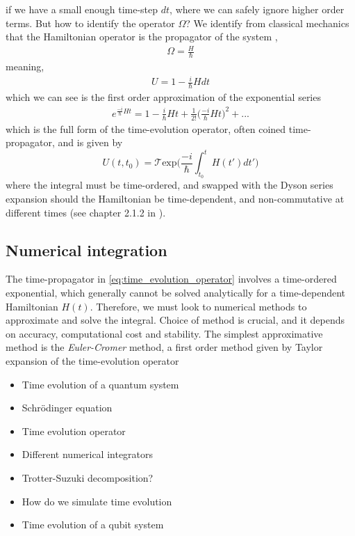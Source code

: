 \documentclass{subfiles}
\begin{document}
if we have a small enough time-step $dt$, where we can safely ignore higher order terms. But how to identify the operator $\Omega$? We identify from classical mechanics that the Hamiltonian operator is the propagator of the system \cite{sakurai1986modern}, 
\begin{align*}
    \Omega = \frac{H}{\hbar}
\end{align*}
meaning, 
\begin{align*}
    U = 1 - \frac{i}{\hbar}Hdt
\end{align*}
which we can see is the first order approximation of the exponential series
\begin{align*}
    e^{\frac{-i}{\hbar}Ht} = 1 - \frac{i}{\hbar}Ht + \frac{1}{2!}\bigg(\frac{-i}{\hbar}Ht\bigg)^2 + ...
\end{align*}
which is the full form of the time-evolution operator, often coined time-propagator, and is given by
\begin{equation}
    U(t, t_0) = \mathcal{T}\text{exp}\bigg(\frac{-i}{\hbar}\int_{t_0}^t H(t')dt'\bigg)\label{eq:time_evolution_operator}
\end{equation}
where the integral must be time-ordered, and swapped with the Dyson series expansion should the Hamiltonian be time-dependent, and non-commutative at different times (see chapter 2.1.2 in \cite{sakurai1986modern}). 
\subsection{Numerical integration}
The time-propagator in \eqref{eq:time_evolution_operator} involves a time-ordered exponential, which generally cannot be solved analytically for a time-dependent Hamiltonian $H(t)$. Therefore, we must look to numerical methods to approximate and solve the integral. Choice of method is crucial, and it depends on accuracy, computational cost and stability. The simplest approximative method is the \emph{Euler-Cromer} method, a first order method given by Taylor expansion of the time-evolution operator


\begin{itemize}
    \item Time evolution of a quantum system
    \item Schrödinger equation
    \item Time evolution operator
    \item Different numerical integrators
    \item Trotter-Suzuki decomposition?
    \item How do we simulate time evolution
    \item Time evolution of a qubit system
\end{itemize}
\end{document}
